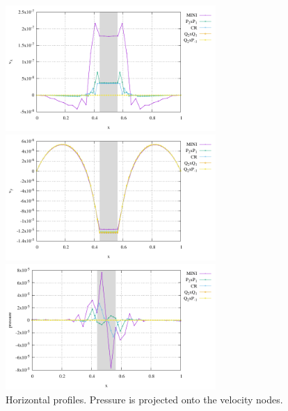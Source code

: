 \begin{center}
\includegraphics[width=8cm]{python_codes/fieldstone_112/results/exp2/hprofile_u.pdf}
\includegraphics[width=8cm]{python_codes/fieldstone_112/results/exp2/hprofile_v.pdf}
\includegraphics[width=8cm]{python_codes/fieldstone_112/results/exp2/hprofile_p.pdf}\\
{\captionfont Horizontal profiles. Pressure is projected onto the velocity nodes.}
\end{center}

